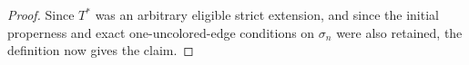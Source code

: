 \begin{proof}
Since \(T^*\) was an arbitrary eligible strict extension, and since the
initial properness and exact one-uncolored-edge conditions on \(\sigma_n\)
were also retained, the definition  now gives the
claim.
\end{proof}
